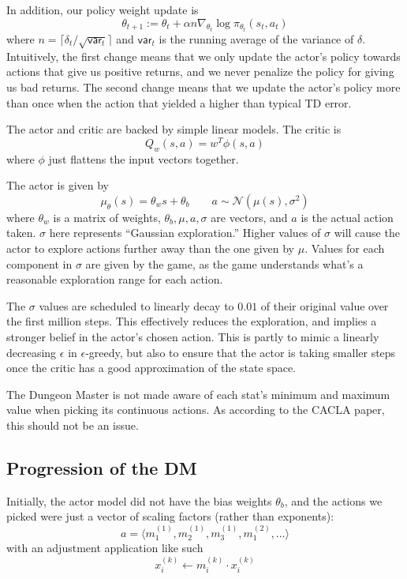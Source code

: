 \documentclass{article}
\begin{document}
In addition, our policy weight update is
$$\theta_{t+1} := \theta_{t} + \alpha n \nabla_{\theta_{t}} \log \pi_{\theta_{t}}(s_{t}, a_{t})$$
where $n = \lceil \delta_t / \sqrt{\mathsf{var}_{t}} \rceil$ and $\mathsf{var}_{t}$ is the running average of the variance of $\delta$. Intuitively, the first change means that we only update the actor's policy towards actions that give us positive returns, and we never penalize the policy for giving us bad returns. The second change means that we update the actor's policy more than once when the action that yielded a higher than typical TD error.

The actor and critic are backed by simple linear models. The critic is
$$Q_w(s,a) = w^T \phi(s,a)$$
where $\phi$ just flattens the input vectors together.

The actor is given by
$$\mu_{\theta}(s) = \theta_w s + \theta_b \qquad a \sim \mathcal{N}(\mu(s), \sigma^2)$$ 
where $\theta_w$ is a matrix of weights, $\theta_b, \mu, a, \sigma$ are vectors, and $a$ is the actual action taken. $\sigma$ here represents ``Gaussian exploration.'' Higher values of $\sigma$ will cause the actor to explore actions further away than the one given by $\mu$. Values for each component in $\sigma$ are given by the game, as the game understands what's a reasonable exploration range for each action.

The $\sigma$ values are scheduled to linearly decay to $0.01$ of their original value over the first million steps. This effectively reduces the exploration, and implies a stronger belief in the actor's chosen action. This is partly to mimic a linearly decreasing $\epsilon$ in $\epsilon$-greedy, but also to ensure that the actor is taking smaller steps once the critic has a good approximation of the state space.

The Dungeon Master is not made aware of each stat's minimum and maximum value when picking its continuous actions. As according to the CACLA paper, this should not be an issue.

\subsection{Progression of the DM}
Initially, the actor model did not have the bias weights $\theta_b$, and the actions we picked were just a vector of scaling factors (rather than exponents):
$$a = \langle m^{(1)}_{1}, m^{(1)}_{2}, m^{(1)}_{3}, m^{(2)}_{1}, \ldots \rangle$$
with an adjustment application like such
$$x^{(k)}_{i} \leftarrow m^{(k)}_i \cdot x^{(k)}_{i}$$
\end{document}
